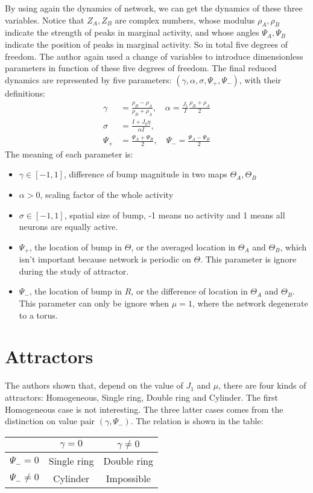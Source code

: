 \documentclass{article}
\begin{document}
	By using again the dynamics of network, we can get the dynamics of these three variables. Notice that $Z_A, Z_B$ are complex numbers, whose modulus $\rho_A,\rho_B$ indicate the strength of peaks in marginal activity, and whose angles $\Psi_A,\Psi_B$ indicate the position of peaks in marginal activity. So in total five degrees of freedom. The author again used a change of variables to introduce dimensionless parameters in function of these five degrees of freedom. The final reduced dynamics are represented by five parameters: $(\gamma, \alpha, \sigma, \Psi_+, \Psi_-)$, with their definitions:
	\begin{equation}
	\begin{split}
	\gamma&=\frac{\rho_B-\rho_A}{\rho_B+\rho_A},\quad \alpha=\frac{J_1}{I}\frac{\rho_B+\rho_A}{2}\\
	\sigma&=\frac{I+J_0\eta}{\alpha I},\quad\\
	\Psi_+ &= \frac{\Psi_A+\Psi_B}{2},\quad \Psi_- = \frac{\Psi_A-\Psi_B}{2}
	\end{split}
	\end{equation}
	The meaning of each parameter is:
	\begin{itemize}
		\item $\gamma\in[-1,1]$, difference of bump magnitude in two maps $\Theta_A,\Theta_B$
		\item $\alpha>0$, scaling factor of the whole activity
		\item $\sigma\in[-1,1]$, spatial size of bump, -1 means no activity and 1 means all neurons are equally active. 
		\item $\Psi_+$, the location of bump in $\Theta$, or the averaged location in $\Theta_A$ and $\Theta_B$, which isn't important because network is periodic on $\Theta$. This parameter is ignore during the study of attractor.
		\item $\Psi_-$, the location of bump in $R$, or the difference of location in $\Theta_A$ and $\Theta_B$. This parameter can only be ignore when $\mu=1$, where the network degenerate to a torus.
	\end{itemize}
	
	\section{Attractors}
	The authors shown that, depend on the value of $J_1$ and $\mu$, there are four kinds of attractors: Homogeneous, Single ring, Double ring and Cylinder. The first Homogeneous case is not interesting. The three latter cases comes from the distinction on value pair $(\gamma,\Psi_-)$. The relation is shown in the table:
	\begin{center}
		\begin{tabular}{ | c | c | c | }
			\hline
			               & $\gamma=0$  & $\gamma\neq 0$ \\ \hline
			$\Psi_-=0$     & Single ring & Double ring \\ \hline
			$\Psi_-\neq 0$ & Cylinder    & Impossible  \\
			\hline
		\end{tabular}
	\end{center}


\end{document}
